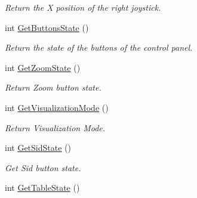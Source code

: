 \begin{DoxyCompactItemize}
\begin{DoxyCompactList}\small\item\em Return the X position of the right joystick. \item\end{DoxyCompactList}\item 
\hypertarget{classvtkVSP_a659a26e683c6084077de26cebc592d0f}{
int \hyperlink{classvtkVSP_a659a26e683c6084077de26cebc592d0f}{GetButtonsState} ()}
\label{classvtkVSP_a659a26e683c6084077de26cebc592d0f}

\begin{DoxyCompactList}\small\item\em Return the state of the buttons of the control panel. \item\end{DoxyCompactList}\item 
\hypertarget{classvtkVSP_acfd028901c1201d7f6683302f729866e}{
int \hyperlink{classvtkVSP_acfd028901c1201d7f6683302f729866e}{GetZoomState} ()}
\label{classvtkVSP_acfd028901c1201d7f6683302f729866e}

\begin{DoxyCompactList}\small\item\em Return Zoom button state. \item\end{DoxyCompactList}\item 
\hypertarget{classvtkVSP_abc1cc8e002e8877c1c7b55572b31e25b}{
int \hyperlink{classvtkVSP_abc1cc8e002e8877c1c7b55572b31e25b}{GetVisualizationMode} ()}
\label{classvtkVSP_abc1cc8e002e8877c1c7b55572b31e25b}

\begin{DoxyCompactList}\small\item\em Return Visualization Mode. \item\end{DoxyCompactList}\item 
\hypertarget{classvtkVSP_ad2566bf82edacc65643c28dc54063240}{
int \hyperlink{classvtkVSP_ad2566bf82edacc65643c28dc54063240}{GetSidState} ()}
\label{classvtkVSP_ad2566bf82edacc65643c28dc54063240}

\begin{DoxyCompactList}\small\item\em Get Sid button state. \item\end{DoxyCompactList}\item 
\hypertarget{classvtkVSP_adc401c4eae1458827784bd43f922bce9}{
int \hyperlink{classvtkVSP_adc401c4eae1458827784bd43f922bce9}{GetTableState} ()}
\label{classvtkVSP_adc401c4eae1458827784bd43f922bce9}


\end{DoxyCompactItemize}
